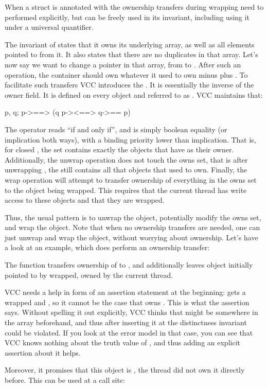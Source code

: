 When a struct is annotated with  the ownership transfers
during wrapping need to performed explicitly, but  can
be freely used in its invariant, including using it under a universal
quantifier.


\noindent
The invariant of  states that it owns its underlying array,
as well as all elements pointed to from it.
It also states that there are no duplicates in that array.
Let's now say we want to change a pointer in that array,
from  to .
After such an operation, the container should own whatever it used
to own minus  plus .
To facilitate such transfers VCC introduces the .
It is essentially the inverse of the owner field.
It is defined on every object  and referred to as .
VCC maintains that:
\begin{VCC}
\forall \object p, q; p->\closed ==> 
  (q \in p->\owns <==> q->\owner == p)
\end{VCC}
The operator \vcc{<==>} reads ``if and only if'', and is simply boolean
equality (or implication both ways), with a binding priority lower than implication.
That is, for closed , the set  contains exactly
the objects that have  as their owner.
Additionally, the unwrap operation does not touch the owns set,
that is after unwrapping , the  still contains
all that objects that  used to own.
Finally, the wrap operation will attempt to transfer ownership
of everything in the owns set to the object being wrapped.
This requires that the current thread has write access to these objects
and that they are wrapped.

Thus, the usual pattern is to unwrap the object, potentially modify the owns
set, and wrap the object.
Note that when no ownership transfers are needed, one can just unwrap
and wrap the object, without worrying about ownership.
Let's have a look at an example, which does perform an ownership transfer:


\noindent
The  function transfers ownership of  to ,
and additionally leaves object initially pointed to by 
wrapped, \ie owned by the current thread.
\begin{note}
VCC needs a help in form of an assertion statement at the beginning:
 gets a wrapped  and , so it cannot be the
case that  owns . This is what the assertion says.
Without spelling it out explicitly, VCC thinks that  might be 
somewhere in the  array beforehand, and
thus after inserting it at  the distinctness invariant could be violated.
If you look at the error model in that case, you can
see that VCC knows nothing about the truth value of ,
and thus adding an explicit assertion about it helps.
\end{note}
Moreover, it promises that this object is , \ie the thread did not own
it directly before.
This can be used at a call site:

